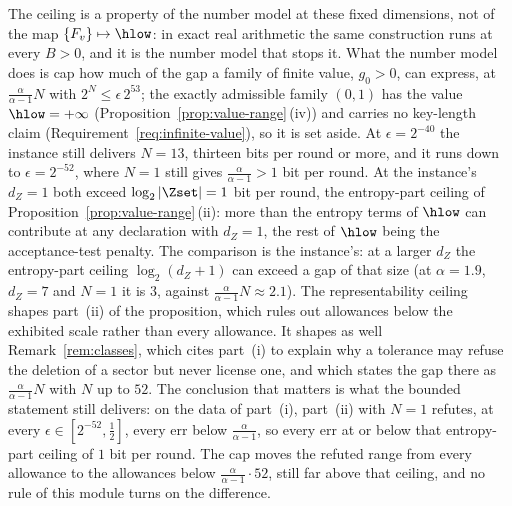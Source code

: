 \begin{remark}
The ceiling is a property of the number model at these fixed dimensions,
not of the map $\{F_v\}\mapsto\hlow$: in exact real arithmetic the same
construction runs at every $B>0$, and it is the number model that stops
it. What the number model does is cap how much of the gap a family of
finite value, $g_0>0$, can express, at $\frac{\alpha}{\alpha-1}N$ with
$2^{N}\le\epsilon\,2^{53}$; the exactly admissible family $(0,1)$ has the
value $\hlow=+\infty$ (Proposition~\ref{prop:value-range}\,(iv)) and carries
no key-length claim (Requirement~\ref{req:infinite-value}), so it is set
aside. At $\epsilon=2^{-40}$ the instance still
delivers $N=13$, thirteen bits per round or more, and it runs down to
$\epsilon=2^{-52}$, where $N=1$ still gives $\frac{\alpha}{\alpha-1}>1$
bit per round. At the instance's $d_Z=1$ both exceed
$\log_2|\Zset|=1$ bit per round, the entropy-part ceiling of
Proposition~\ref{prop:value-range}\,(ii): more than the entropy terms of $\hlow$ can
contribute at any declaration with $d_Z=1$, the rest of $\hlow$ being the
acceptance-test penalty. The comparison is the instance's: at a larger
$d_Z$ the entropy-part ceiling $\log_2(d_Z+1)$ can exceed a gap of that
size (at $\alpha=1.9$, $d_Z=7$ and $N=1$ it is $3$, against
$\frac{\alpha}{\alpha-1}N\approx2.1$). The representability ceiling
shapes part~(ii) of the proposition, which rules out allowances below the
exhibited scale rather than every allowance. It shapes as well
Remark~\ref{rem:classes},
which cites part~(i) to explain why a tolerance may refuse the deletion of
a sector but never license one, and which states the gap there as
$\frac{\alpha}{\alpha-1}N$ with $N$ up to $52$. The conclusion that
matters is what the bounded statement still delivers: on the data of
part~(i), part~(ii) with $N=1$ refutes, at every
$\epsilon\in[2^{-52},\tfrac12]$, every $\mathrm{err}$ below
$\frac{\alpha}{\alpha-1}$, so every $\mathrm{err}$ at or below that
entropy-part ceiling of $1$ bit per round. The cap moves the refuted range
from every allowance to the allowances below
$\frac{\alpha}{\alpha-1}\cdot52$, still far above that ceiling, and no
rule of this module turns on the difference.
\end{remark}
